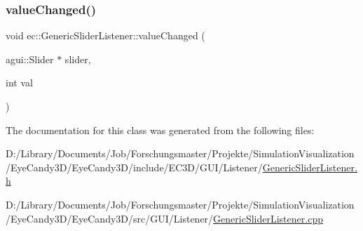 \mbox{\label{classec_1_1_generic_slider_listener_a884faf715962f7785174edec063aa145}} 
\subsubsection{\texorpdfstring{value\+Changed()}{valueChanged()}}
{\footnotesize\ttfamily void ec\+::\+Generic\+Slider\+Listener\+::value\+Changed (\begin{DoxyParamCaption}\item[{agui\+::\+Slider $\ast$}]{slider,  }\item[{int}]{val }\end{DoxyParamCaption})\hspace{0.3cm}{\ttfamily [override]}}



The documentation for this class was generated from the following files\+:\begin{DoxyCompactItemize}
\item 
D\+:/\+Library/\+Documents/\+Job/\+Forschungsmaster/\+Projekte/\+Simulation\+Visualization/\+Eye\+Candy3\+D/\+Eye\+Candy3\+D/include/\+E\+C3\+D/\+G\+U\+I/\+Listener/\mbox{\hyperlink{_generic_slider_listener_8h}{Generic\+Slider\+Listener.\+h}}\item 
D\+:/\+Library/\+Documents/\+Job/\+Forschungsmaster/\+Projekte/\+Simulation\+Visualization/\+Eye\+Candy3\+D/\+Eye\+Candy3\+D/src/\+G\+U\+I/\+Listener/\mbox{\hyperlink{_generic_slider_listener_8cpp}{Generic\+Slider\+Listener.\+cpp}}\end{DoxyCompactItemize}
